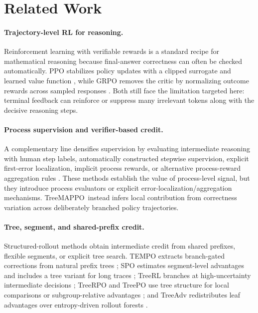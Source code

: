 \documentclass{article}
\newcommand{\ours}{TreeMAPPO\xspace}
\begin{document}
\section{Related Work}
\paragraph{Trajectory-level RL for reasoning.}
Reinforcement learning with verifiable rewards is a standard recipe for mathematical reasoning because final-answer correctness can often be checked automatically. PPO stabilizes policy updates with a clipped surrogate and learned value function \cite{ppo17}, while GRPO removes the critic by normalizing outcome rewards across sampled responses \cite{deepseekmath2024}. Both still face the limitation targeted here: terminal feedback can reinforce or suppress many irrelevant tokens along with the decisive reasoning steps.

\paragraph{Process supervision and verifier-based credit.}
A complementary line densifies supervision by evaluating intermediate reasoning with human step labels, automatically constructed stepwise supervision, explicit first-error localization, implicit process rewards, or alternative process-reward aggregation rules \cite{lightman2023letsverify,mathshepherd2024,selfexplore2024,prime2025,pure2025}. These methods establish the value of process-level signal, but they introduce process evaluators or explicit error-localization/aggregation mechanisms. \ours\ instead infers local contribution from correctness variation across deliberately branched policy trajectories.

\paragraph{Tree, segment, and shared-prefix credit.}
Structured-rollout methods obtain intermediate credit from shared prefixes, flexible segments, or explicit tree search. TEMPO extracts branch-gated corrections from natural prefix trees \cite{tempo2025}; SPO estimates segment-level advantages and includes a tree variant for long traces \cite{spo2025}; TreeRL branches at high-uncertainty intermediate decisions \cite{treerl2025}; TreeRPO and TreePO use tree structure for local comparisons or subgroup-relative advantages \cite{treerpo2025,treepo2025}; and TreeAdv redistributes leaf advantages over entropy-driven rollout forests \cite{treeadv2026}.
\end{document}
